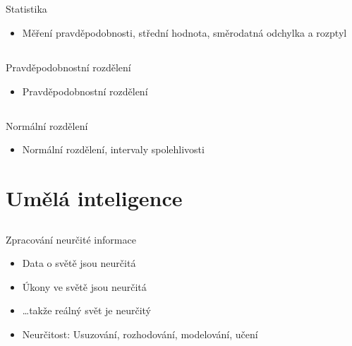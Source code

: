 \documentclass{beamer}
\begin{document}
\subsection{}
\begin{frame}{Statistika}
\begin{itemize}
\item Měření pravděpodobnosti, střední hodnota, směrodatná odchylka a rozptyl
\end{itemize}
\end{frame}

\subsection{}
\begin{frame}{Pravděpodobnostní rozdělení}
\begin{itemize}
\item Pravděpodobnostní rozdělení
\end{itemize}
\end{frame}

\subsection{}
\begin{frame}{Normální rozdělení}
\begin{itemize}
\item Normální rozdělení, intervaly spolehlivosti
\end{itemize}
\end{frame}

\section{Umělá inteligence}

\subsection{}
\begin{frame}{Zpracování neurčité informace}
\begin{itemize}
\item Data o světě jsou neurčitá
\item Úkony ve světě jsou neurčitá
\item \dots takže reálný svět je neurčitý
\item Neurčitost: Usuzování, rozhodování, modelování, učení
\end{itemize}
\end{frame}
\end{document}
